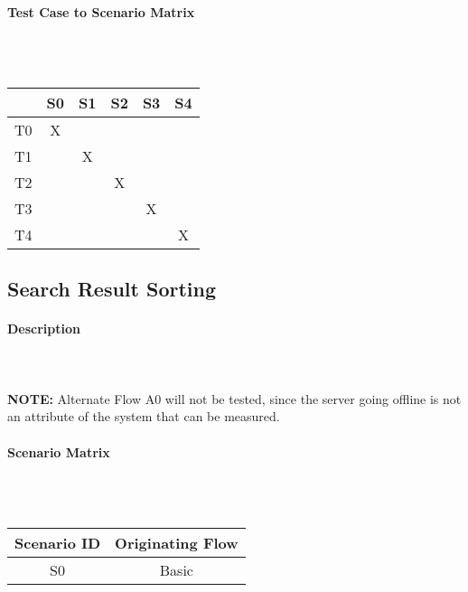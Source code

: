\documentclass{article}
\begin{document}
\paragraph{Test Case to Scenario Matrix}~\\ \\
\begin{tabular}{ | c || c | c | c | c | c | }
\hline
    & S0 & S1 & S2 & S3 & S4 \\
\hline
\hline
T0 & X  &    &    &    &    \\
\hline
T1 &    & X  &    &    &    \\
\hline
T2 &    &    & X  &    &    \\
\hline
T3 &    &    &    & X  &    \\
\hline
T4 &    &    &    &    & X  \\
\hline
\end{tabular}

\subsection{Search Result Sorting}
\paragraph{Description}
~\\ \\
\textbf{NOTE:} Alternate Flow A0 will not be tested, since the server going offline is not an attribute of the system that can be measured.
\paragraph{Scenario Matrix}~\\ \\
\begin{tabular}{ c  c }
\hline
Scenario ID & Originating Flow\\
\hline
\hline
S0 & Basic\\
\hline
\end{tabular}\\
~\\
~\\
\end{document}
